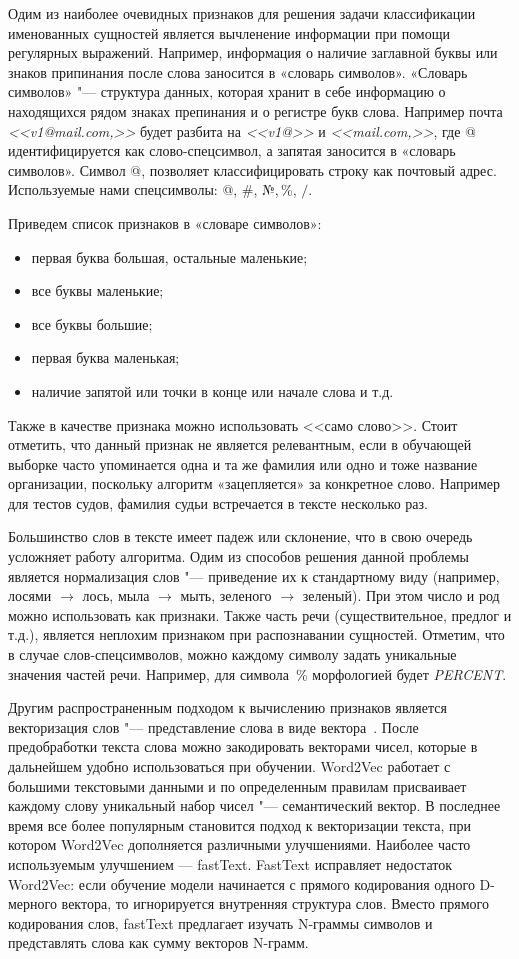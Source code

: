 \documentclass{csmathnotes}
\begin{document}
Одим из наиболее очевидных признаков для решения задачи классификации именованных сущностей является вычленение информации при помощи регулярных выражений. Например, информация о наличие заглавной буквы или знаков припинания после слова заносится в  «словарь символов». «Словарь символов» "--- структура данных, которая хранит в себе информацию о находящихся рядом знаках препинания и о регистре букв слова.
Например почта \emph{<<v1@mail.com,>>} будет разбита на \emph{<<v1@>>} и \emph{<<mail.com,>>}, где @ идентифицируется как слово-спецсимвол, а запятая заносится в «словарь символов». Символ @, позволяет классифицировать строку как почтовый адрес. Используемые нами спецсимволы: @, \#, №,\,\%, $/$.


Приведем список признаков в «словаре символов»:
\begin{itemize}
    \item первая буква большая, остальные маленькие;
    \item все буквы маленькие;
    \item все буквы большие;
    \item первая буква маленькая;
    \item наличие запятой или точки в конце или начале слова и т.д.
\end{itemize}


Также в качестве признака можно использовать <<само слово>>. Стоит отметить, что данный признак не является релевантным, если в обучающей выборке часто упоминается одна и та же фамилия или одно и тоже название организации, поскольку алгоритм «зацепляется» за конкретное слово.
Например для тестов судов, фамилия судьи встречается в тексте несколько раз.


Большинство слов в тексте имеет падеж или склонение, что в свою очередь усложняет работу алгоритма.
Одим из способов решения данной проблемы является нормализация слов "--- приведение их к стандартному виду
(например, лосями $\rightarrow$  лось, мыла $\rightarrow$ мыть, зеленого $\rightarrow$ зеленый).
При этом число и род можно использовать как признаки.
Также часть речи (существительное, предлог и т.д.), является неплохим признаком при распознавании сущностей.
Отметим, что в случае слов-спецсимволов, можно каждому символу задать уникальные значения частей речи.
Например, для символа \,\% морфологией будет \emph{PERCENT}.

 
Другим распространенным подходом к вычислению признаков является векторизация слов "---  представление слова в виде вектора~\cite{w2v}.
После предобработки текста слова можно закодировать векторами чисел, которые в дальнейшем удобно использоваться при обучении.
Word2Vec работает с большими текстовыми данными и по определенным правилам присваивает каждому слову уникальный набор чисел "--- семантический вектор. В последнее время все более популярным становится подход к векторизации текста, при котором Word2Vec дополняется различными улучшениями. Наиболее часто используемым улучшением — fastText. FastText исправляет недостаток Word2Vec: если обучение модели начинается с прямого кодирования одного D-мерного вектора, то игнорируется внутренняя структура слов. Вместо прямого кодирования слов, fastText предлагает изучать N-граммы символов и представлять слова как сумму векторов N-грамм.
\end{document}
